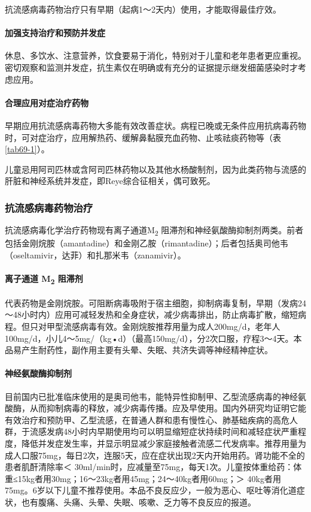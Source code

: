 抗流感病毒药物治疗只有早期（起病1～2天内）使用，才能取得最佳疗效。

\paragraph{加强支持治疗和预防并发症}

休息、多饮水、注意营养，饮食要易于消化，特别对于儿童和老年患者更应重视。密切观察和监测并发症，抗生素仅在明确或有充分的证据提示继发细菌感染时才考虑应用。

\paragraph{合理应用对症治疗药物}

早期应用抗流感病毒药物大多能有效改善症状。病程已晚或无条件应用抗病毒药物时，可对症治疗，应用解热药、缓解鼻黏膜充血药物、止咳祛痰药物等（表\ref{tab69-1}）。

儿童忌用阿司匹林或含阿司匹林药物以及其他水杨酸制剂，因为此类药物与流感的肝脏和神经系统并发症，即Reye综合征相关，偶可致死。

\subsubsection{抗流感病毒药物治疗}

抗流感病毒化学治疗药物现有离子通道M\textsubscript{2}
阻滞剂和神经氨酸酶抑制剂两类。前者包括金刚烷胺（amantadine）和金刚乙胺（rimantadine）；后者包括奥司他韦（oseltamivir，达菲）和扎那米韦（zanamivir）。

\paragraph{离子通道 M\textsubscript{2} 阻滞剂}

代表药物是金刚烷胺。可阻断病毒吸附于宿主细胞，抑制病毒复制，早期（发病24～48小时内）应用可减轻发热和全身症状，减少病毒排出，防止病毒扩散，缩短病程。但只对甲型流感病毒有效。金刚烷胺推荐用量为成人200mg/d，老年人100mg/d，小儿4～5mg/（kg•d）（最高150mg/d），分2次口服，疗程3～4天。本品易产生耐药性，副作用主要有头晕、失眠、共济失调等神经精神症状。

\paragraph{神经氨酸酶抑制剂}

目前国内已批准临床使用的是奥司他韦，能特异性抑制甲、乙型流感病毒的神经氨酸酶，从而抑制病毒的释放，减少病毒传播。应及早使用。国内外研究均证明它能有效治疗和预防甲、乙型流感，在普通人群和患有慢性心、肺基础疾病的高危人群，于流感发病48小时内早期使用均可以明显缩短症状持续时间和减轻症状严重程度，降低并发症发生率，并显示明显减少家庭接触者流感二代发病率。推荐用量为成人口服75mg，每日2次，连服5天，应在症状出现2天内开始用药。肾功能不全的患者肌酐清除率＜
30ml/min时，应减量至75mg，每天1次。儿童按体重给药：体重≤15kg者用30mg；16～23kg者用45mg；24～40kg者用60mg；＞
40kg者用75mg。6岁以下儿童不推荐使用。本品不良反应少，一般为恶心、呕吐等消化道症状，也有腹痛、头痛、头晕、失眠、咳嗽、乏力等不良反应的报道。

